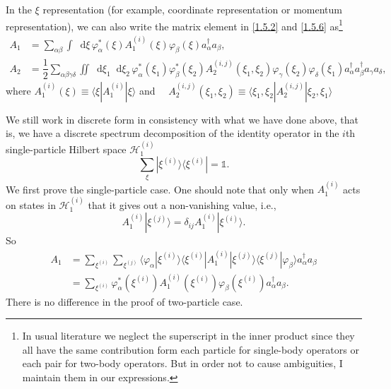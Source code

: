 \documentclass[b5paper,10pt,UTF8]{book}
\newcommand*\dd{\mathop{}\!\mathrm{d}}
\numberwithin{equation}{section}
\begin{document}
		\begin{Corollary}
			In the $\xi$ representation (for example, coordinate representation or momentum representation), we can also write the matrix element in \eqref{1.5.2} and \eqref{1.5.6} as\footnote{In usual literature we neglect the superscript in the inner product since they all have the same contribution form each particle for single-body operators or each pair for two-body operators. But in order not to cause ambiguities, I maintain them in our expressions.}
			\begin{align}
				A_1&=\sum_{\alpha\beta}\int\dd\xi\,\varphi^*_\alpha(\xi)A_1^{(i)}(\xi)\varphi_\beta(\xi)a_\alpha^\dagger a_\beta,\label{1.5.7}\\
				A_2&=\dfrac{1}{2}\sum_{\alpha\beta\gamma\delta}\iint\dd\xi_1\dd\xi_2\,\varphi_\alpha^*(\xi_1)\varphi_\beta^*(\xi_2)A_2^{(i,j)}(\xi_1,\xi_2)\varphi_\gamma(\xi_2)\varphi_\delta(\xi_1)a_\alpha^\dagger a_\beta^\dagger a_\gamma a_\delta,\label{1.5.8}
			\end{align}
			where $A_1^{(i)}(\xi)\equiv\langle\xi|A_1^{(i)}|\xi\rangle$ and $\quad A_2^{(i,j)}(\xi_1,\xi_2)\equiv\langle\xi_1,\xi_2|A_2^{(i,j)}|\xi_2,\xi_1\rangle$
		\end{Corollary}
		\begin{Proof}
			We still work in discrete form in consistency with what we have done above, that is, we have a discrete spectrum decomposition of the identity operator in the $i$th single-particle Hilbert space $\mathcal{H}_1^{(i)}$
			$$\displaystyle\sum_\xi|\xi^{(i)}\rangle\langle\xi^{(i)}|=\mathbb{1}.$$
			\indent We first prove the single-particle case. One should note that only when $A_1^{(i)}$ acts on states in $\mathcal{H}_1^{(i)}$ that it gives out a non-vanishing value, i.e.,
			\begin{equation}\label{1.5.9}
				A_1^{(i)}|\xi^{(j)}\rangle=\delta_{ij}A_1^{(i)}|\xi^{(i)}\rangle.
			\end{equation}
			So
			\begin{align*}
				A_1&=\sum_{\xi^{(i)}}\sum_{\xi^{(j)}}\langle\varphi_\alpha|\xi^{(i)}\rangle\langle\xi^{(i)}|A_1^{(i)}|\xi^{(j)}\rangle\langle\xi^{(j)}|\varphi_\beta\rangle a_\alpha^\dagger a_\beta\\
				&=\sum_{\xi^{(i)}}\varphi^*_\alpha(\xi^{(i)})A_1^{(i)}(\xi^{(i)})\varphi_\beta(\xi^{(i)})a_\alpha^\dagger a_\beta.
			\end{align*}
			There is no difference in the proof of two-particle case.
		\end{Proof}
\end{document}
